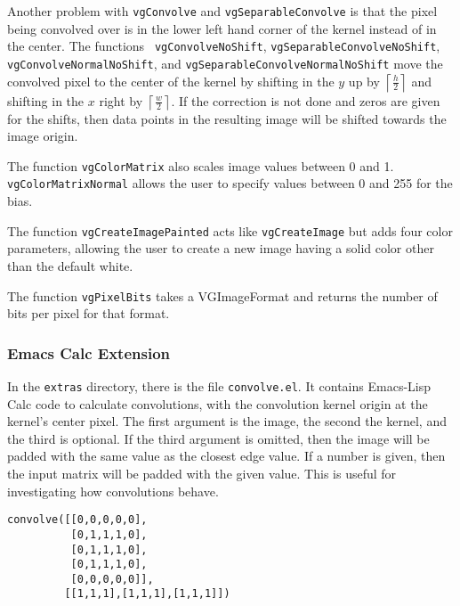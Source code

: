 \documentclass[12pt]{report}
\begin{document}
Another problem with {\tt vgConvolve} and {\tt vgSeparableConvolve} is
that the pixel being convolved over is in the lower left hand corner
of the kernel instead of in the center. The functions {\tt
  vgConvolveNoShift}, {\tt vgSeparableConvolveNoShift}, {\tt
  vgConvolveNormalNoShift}, and {\tt vgSeparableConvolveNormalNoShift}
move the convolved pixel to the center of the kernel by shifting in
the $y$ up by $\left\lceil\frac{h}{2}\right\rceil$ and shifting in the
$x$ right by $\left\lceil\frac{w}{2}\right\rceil$. If the correction is not
done and zeros are given for the shifts, then data points in the
resulting image will be shifted towards the image origin.

The function {\tt vgColorMatrix} also scales image values between 0
and 1.\\ {\tt vgColorMatrixNormal} allows the user to specify values
between 0 and 255 for the bias.

The function {\tt vgCreateImagePainted} acts like {\tt vgCreateImage} but
adds four color parameters, allowing the user to create a new
image having a solid color other than the default white.

The function {\tt vgPixelBits} takes a VGImageFormat and returns the
number of bits per pixel for that format.

\subsubsection{Emacs Calc Extension}
\label{sec-3-1-4-1}
In the {\tt extras} directory, there is the file {\tt convolve.el}. It
contains Emacs-Lisp Calc code to calculate convolutions, with the
convolution kernel origin at the kernel's center pixel. The first
argument is the image, the second the kernel, and the third is
optional. If the third argument is omitted, then the image will be
padded with the same value as the closest edge value. If a number is
given, then the input matrix will be padded with the given value. This
is useful for investigating how convolutions behave.

\begin{lstlisting}
convolve([[0,0,0,0,0],
          [0,1,1,1,0],
          [0,1,1,1,0],
          [0,1,1,1,0],
          [0,0,0,0,0]],
         [[1,1,1],[1,1,1],[1,1,1]])
\end{lstlisting}
\end{document}
